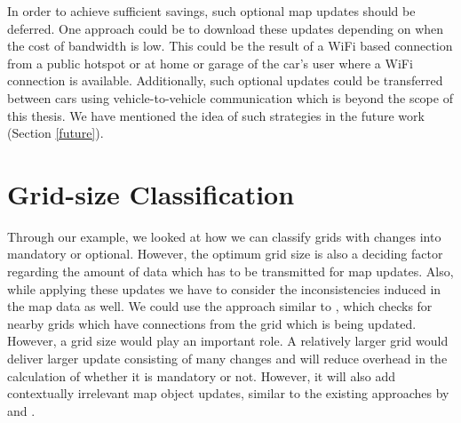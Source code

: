 In order to achieve sufficient savings, such optional map updates should be deferred. One approach could be to download these updates depending on when the cost of bandwidth is low. This could be the result of a WiFi based connection from a public hotspot or at home or garage of the car's user where a WiFi connection is available. Additionally, such optional updates could be transferred between cars using vehicle-to-vehicle communication which is beyond the scope of this thesis. We have mentioned the idea of such strategies in the future work (Section \ref{future}).
\section{Grid-size Classification} \label{gridsizeclassification}
Through our example, we looked at how we can classify grids with changes into mandatory or optional. However, the optimum grid size is also a deciding factor regarding the amount of data which has to be transmitted for map updates. Also, while applying these updates we have to consider the inconsistencies induced in the map data as well. We could use the approach similar to \citet{asahara2008locally}, which checks for nearby grids which have connections from the grid which is being updated. However, a grid size would play an important role. A relatively larger grid would deliver larger update consisting of many changes and will reduce overhead in the calculation of whether it is mandatory or not. However, it will also add contextually irrelevant map object updates, similar to the existing approaches by \cite{min2011system} and \cite{bastiaensen2003actmap}. \\

